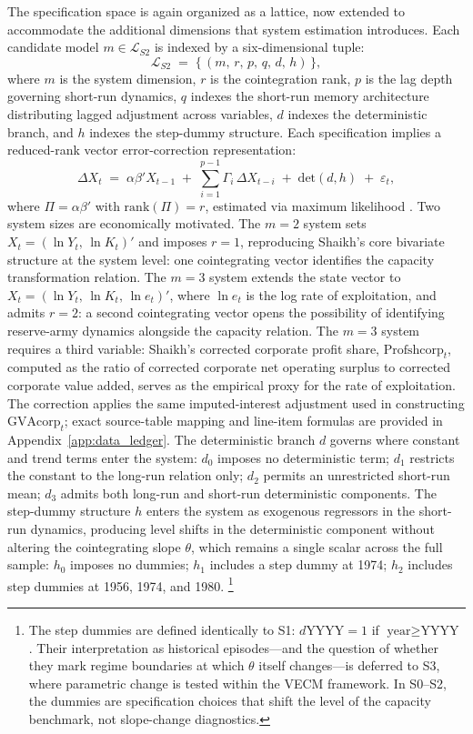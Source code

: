 \documentclass[11pt,a4paper]{article}
\begin{document}
The specification space is again organized as a lattice, now extended to
accommodate the additional dimensions that system estimation introduces. Each
candidate model $m \in \mathcal{L}_{S2}$ is indexed by a six-dimensional
tuple:
%
\begin{equation}
	\label{eq:S2_lattice}
	\mathcal{L}_{S2} \;=\;
	\bigl\{\,(m,\, r,\, p,\, q,\, d,\, h)\,\bigr\},
\end{equation}
%
where $m$ is the system dimension, $r$ is the cointegration rank, $p$ is the
lag depth governing short-run dynamics, $q$ indexes the short-run memory
architecture distributing lagged adjustment across variables, $d$ indexes the
deterministic branch, and $h$ indexes the step-dummy structure. Each
specification implies a reduced-rank vector error-correction representation:
%
\begin{equation}
	\label{eq:S2_vecm}
	\Delta X_t \;=\; \alpha\beta' X_{t-1}
	\;+\; \sum_{i=1}^{p-1} \Gamma_i \,\Delta X_{t-i}
	\;+\; \text{det}(d,h)
	\;+\; \varepsilon_t,
\end{equation}
%
where $\Pi = \alpha\beta'$ with $\mathrm{rank}(\Pi) = r$, estimated via
maximum likelihood \citep{Stigler2020}. Two system
sizes are economically motivated. The $m = 2$ system sets
$X_t = (\ln Y_t,\, \ln K_t)'$ and imposes $r = 1$, reproducing Shaikh's
core bivariate structure at the system level: one cointegrating vector
identifies the capacity transformation relation. The $m = 3$ system extends
the state vector to $X_t = (\ln Y_t,\, \ln K_t,\, \ln e_t)'$, where
$\ln e_t$ is the log rate of exploitation, and admits $r = 2$: a second
cointegrating vector opens the possibility of identifying reserve-army
dynamics alongside the capacity relation. The $m = 3$ system requires a
third variable: Shaikh's corrected corporate profit share,
$\text{Profshcorp}_t$, computed as the ratio of corrected corporate net
operating surplus to corrected corporate value added, serves as the empirical proxy
for the rate of exploitation. The correction applies the same
imputed-interest adjustment used in constructing $\text{GVAcorp}_t$; exact
source-table mapping and line-item formulas are provided in
Appendix~\ref{app:data_ledger}. The deterministic branch $d$ governs where
constant and trend terms enter the system: $d_0$ imposes no deterministic
term; $d_1$ restricts the constant to the long-run relation only; $d_2$
permits an unrestricted short-run mean; $d_3$ admits both long-run and
short-run deterministic components. The step-dummy structure $h$ enters the
system as exogenous regressors in the short-run dynamics, producing level
shifts in the deterministic component without altering the cointegrating
slope $\theta$, which remains a single scalar across the full sample:
$h_0$ imposes no dummies; $h_1$ includes a step dummy at 1974;
$h_2$ includes step dummies at 1956, 1974, and 1980.%
\footnote{The step dummies are defined identically to S1: $d\text{YYYY} = 1$
	if $\text{year} \geq \text{YYYY}$. Their interpretation as historical
	episodes---and the question of whether they mark regime boundaries at which
	$\theta$ itself changes---is deferred to S3, where parametric change is
	tested within the VECM framework. In S0--S2, the dummies are specification
	choices that shift the level of the capacity benchmark, not slope-change
	diagnostics.}
\end{document}
